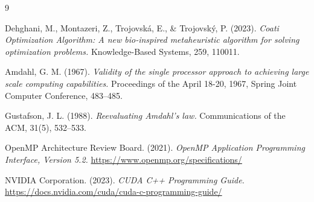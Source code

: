 \documentclass[12pt, a4paper]{article}
\begin{document}
\begin{thebibliography}{9}

Dehghani, M., Montazeri, Z., Trojovsk\'{a}, E., \& Trojovsk\'{y}, P. (2023).
\textit{Coati Optimization Algorithm: A new bio-inspired metaheuristic algorithm for solving optimization problems.}
Knowledge-Based Systems, 259, 110011.

Amdahl, G. M. (1967).
\textit{Validity of the single processor approach to achieving large scale computing capabilities.}
Proceedings of the April 18-20, 1967, Spring Joint Computer Conference, 483--485.

Gustafson, J. L. (1988).
\textit{Reevaluating Amdahl's law.}
Communications of the ACM, 31(5), 532--533.

OpenMP Architecture Review Board. (2021).
\textit{OpenMP Application Programming Interface, Version 5.2.}
\url{https://www.openmp.org/specifications/}

NVIDIA Corporation. (2023).
\textit{CUDA C++ Programming Guide.}
\url{https://docs.nvidia.com/cuda/cuda-c-programming-guide/}

\end{thebibliography}

\end{document}
